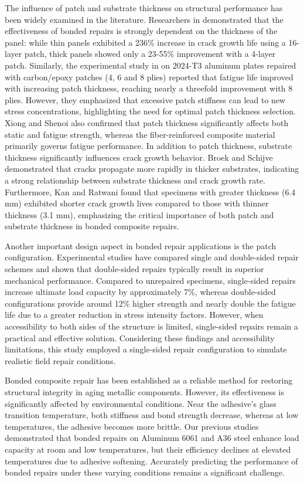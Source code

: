 \documentclass[journal,article,submit,pdftex,moreauthors]{Definitions/mdpi}
\begin{document}
The influence of patch and substrate thickness on structural performance has been widely examined in the literature. Researchers in \cite{Hosseini} demonstrated that the effectiveness of bonded repairs is strongly dependent on the thickness of the panel: while thin panels exhibited a 236\% increase in crack growth life using a 16-layer patch, thick panels showed only a 23-55\% improvement with a 4-layer patch.
Similarly, the experimental study in \cite{Sohail} on 2024-T3 aluminum plates repaired with carbon/epoxy patches (4, 6 and 8 plies) reported that fatigue life improved with increasing patch thickness, reaching nearly a threefold improvement with 8 plies. However, they emphasized that excessive patch stiffness can lead to new stress concentrations, highlighting the need for optimal patch thickness selection. Xiong and Shenoi \cite{Xiong} also confirmed that patch thickness significantly affects both static and fatigue strength, whereas the fiber-reinforced composite material primarily governs fatigue performance. In addition to patch thickness, substrate thickness significantly influences crack growth behavior. Broek and Schijve \cite{Broek} demonstrated that cracks propagate more rapidly in thicker substrates, indicating a strong relationship between substrate thickness and crack growth rate. Furthermore, Kan and Ratwani \cite{Kan} found that specimens with greater thickness (6.4 mm) exhibited shorter crack growth lives compared to those with thinner thickness (3.1 mm), emphasizing the critical importance of both patch and substrate thickness in bonded composite repairs. 

Another important design aspect in bonded repair applications is the patch configuration.
Experimental studies \cite{Srilakshmi,Ramji,Liu,LiL,Günther} have compared single and double-sided repair schemes and shown that double-sided repairs typically result in superior mechanical performance. Compared to unrepaired specimens, single-sided repairs increase ultimate load capacity by approximately 7\%, whereas double-sided configurations provide around 12\% higher strength and nearly double the fatigue life due to a greater reduction in stress intensity factors. However, when accessibility to both sides of the structure is limited, single-sided repairs remain a practical and effective solution. Considering these findings and accessibility limitations, this study employed a single-sided repair configuration to simulate realistic field repair conditions.

Bonded composite repair has been established as a reliable method for restoring structural integrity in aging metallic components. However, its effectiveness is significantly affected by environmental conditions. Near the adhesive’s glass transition temperature, both stiffness and bond strength decrease, whereas at low temperatures, the adhesive becomes more brittle. Our previous studies \cite{Kokner,Yesim} demonstrated that bonded repairs on Aluminum 6061 and A36 steel enhance load capacity at room and low temperatures, but their efficiency declines at elevated temperatures due to adhesive softening. Accurately predicting the performance of bonded repairs under these varying conditions remains a significant challenge.
\end{document}
